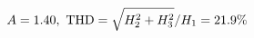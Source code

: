 \documentclass[preview]{standalone}
\begin{document}
\begin{align*}
\special{dvisvgm:raw <g id='unique000'>}A=1.40,\ \text{THD}=\sqrt{H_2^2+H_3^2}/H_1=21.9\%\special{dvisvgm:raw </g>}
\end{align*}
\end{document}

